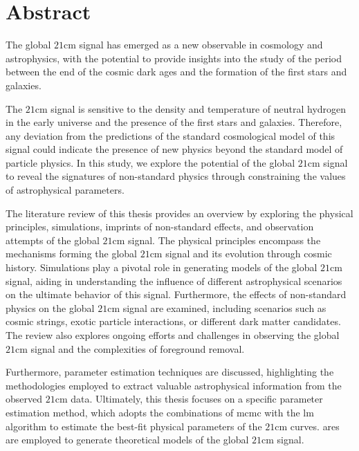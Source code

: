 \documentclass[12pt, TexShade, letterpaper]{report}
\begin{document}
\chapter*{Abstract}
	\label{chap:engAbstract}
The global $\mathrm{21cm}$ signal has emerged as a new observable in cosmology and astrophysics, with the potential to provide insights into the study of the period between the end of the cosmic dark ages and the formation of the first stars and galaxies.\par

The $\mathrm{21cm}$ signal is sensitive to the density and temperature of neutral hydrogen in the early universe and the presence of the first stars and galaxies. Therefore, any deviation from the predictions of the standard cosmological model of this signal could indicate the presence of new physics beyond the standard model of particle physics.
In this study, we explore the potential of the global $\mathrm{21cm}$ signal to reveal the signatures of non-standard physics through constraining the values of astrophysical parameters.\par

The literature review of this thesis provides an overview by exploring the physical principles, simulations, imprints of non-standard effects, and observation attempts of the global $\mathrm{21cm}$ signal. The physical principles encompass the mechanisms forming the global $\mathrm{21cm}$ signal and its evolution through cosmic history. Simulations play a pivotal role in generating models of the global $\mathrm{21cm}$ signal, aiding in understanding the influence of different astrophysical scenarios on the ultimate behavior of this signal. Furthermore, the effects of non-standard physics on the global $\mathrm{21cm}$ signal are examined, including scenarios such as cosmic strings, exotic particle interactions, or different dark matter candidates. The review also explores ongoing efforts and challenges in observing the global $\mathrm{21cm}$ signal and the complexities of foreground removal.\par

Furthermore, parameter estimation techniques are discussed, highlighting the methodologies employed to extract valuable astrophysical information from the observed $\mathrm{21cm}$ data. Ultimately, this thesis focuses on a specific parameter estimation method, which adopts the combinations of \gls{mcmc} with the \gls{lm} algorithm to estimate the best-fit physical parameters of the $\mathrm{21cm}$ curves. \gls{ares} are employed to generate theoretical models of the global $\mathrm{21cm}$ signal.\par
\end{document}
